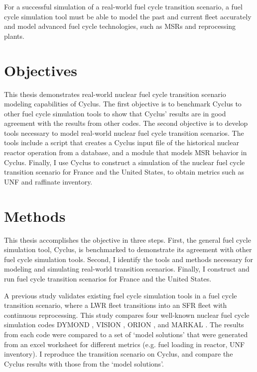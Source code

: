 For a successful simulation of a real-world fuel cycle transition
scenario, a fuel cycle simulation tool must be able to 
model the past and current fleet accurately and model advanced
fuel cycle technologies, such as \glspl{MSR} and reprocessing plants.

\section{Objectives}

This thesis demonstrates real-world nuclear fuel cycle transition
scenario modeling capabilities of Cyclus. The first objective is
to benchmark Cyclus to other fuel cycle simulation tools to
show that Cyclus' results are in good agreement with the results
from other codes. The second objective is to develop tools
necessary to model real-world nuclear fuel cycle transition
scenarios. The tools include a script that creates a Cyclus
input file of the historical nuclear reactor operation from
a database, and a module that models \gls{MSR} behavior in Cyclus.
Finally, I use Cyclus to construct a simulation of the nuclear
fuel cycle transition scenario for France and the United States,
to obtain metrics such as \gls{UNF} and raffinate inventory.


\section{Methods}
This thesis accomplishes the objective in three steps. First,
the general fuel cycle simulation tool, Cyclus, is benchmarked
to demonstrate its agreement with other fuel cycle simulation
tools. Second, I identify the tools and methods necessary
for modeling and simulating real-world transition scenarios.
Finally, I construct and run fuel cycle transition scenarios
for France and the United States.

A previous study \cite{feng_standardized_2016} validates existing fuel cycle
simulation tools in a fuel cycle transition scenario, where a \gls{LWR} fleet
transitions into an \gls{SFR} fleet with continuous reprocessing. This 
study compares four well-known nuclear fuel cycle simulation codes
DYMOND \cite{yacout_modeling_2005},
VISION \cite{jacobson_verifiable_2010},
ORION \cite{gregg_analysis_2012}, and
MARKAL \cite{shay_epa_2006}. The results from each code were
compared to a set of `model solutions' that were generated
from an excel worksheet for different metrics (e.g. fuel loading
in reactor, \gls{UNF} inventory). I reproduce the transition
scenario on Cyclus, and compare the Cyclus results with those
from the `model solutions'.

